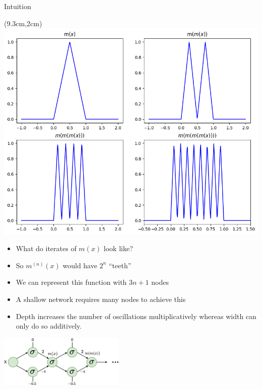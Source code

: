 \documentclass[serif, aspectratio=169]{beamer}
\begin{document}
\begin{frame}{Intuition}
	\begin{textblock*}{5cm}(9.3cm,2cm) %
		\includegraphics[keepaspectratio, scale=0.3]{pic/saw}
	\end{textblock*}
	\begin{itemize}
		\item What do iterates of $m(x)$ look like?
		\item So $m^{(n)}(x)$ would have $2^n$ “teeth”
		\item We can represent this function with $3n+1$ \newline nodes 
		\item A shallow network requires many nodes to \newline achieve this
		\item Depth increases the number of oscillations \newline multiplicatively whereas width can only do so \newline additively.
	\end{itemize}
	\hspace{1.3cm}\includegraphics[keepaspectratio, width=6cm]{pic/2h}
\end{frame}
\end{document}
